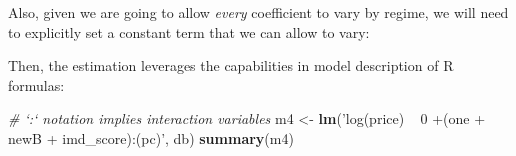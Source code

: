 \documentclass[
]{book}
\newenvironment{Shaded}{\begin{snugshade}}{\end{snugshade}}
\newcommand{\CommentTok}[1]{\textcolor[rgb]{0.56,0.35,0.01}{\textit{#1}}}
\newcommand{\DecValTok}[1]{\textcolor[rgb]{0.00,0.00,0.81}{#1}}
\newcommand{\KeywordTok}[1]{\textcolor[rgb]{0.13,0.29,0.53}{\textbf{#1}}}
\newcommand{\NormalTok}[1]{#1}
\newcommand{\OperatorTok}[1]{\textcolor[rgb]{0.81,0.36,0.00}{\textbf{#1}}}
\newcommand{\StringTok}[1]{\textcolor[rgb]{0.31,0.60,0.02}{#1}}
\begin{document}
\begin{Shaded}
\end{Shaded}

Also, given we are going to allow \emph{every} coefficient to vary by regime, we will need to explicitly set a constant term that we can allow to vary:

\begin{Shaded}
\end{Shaded}

Then, the estimation leverages the capabilities in model description of R formulas:

\begin{Shaded}
\begin{Highlighting}[]
\CommentTok{# `:` notation implies interaction variables}
\NormalTok{m4 <-}\StringTok{ }\KeywordTok{lm}\NormalTok{(}\StringTok{'log(price) ~ 0 +(one + newB + imd_score):(pc)'}\NormalTok{, db)}
\KeywordTok{summary}\NormalTok{(m4)}
\end{Highlighting}
\end{Shaded}
\end{document}

